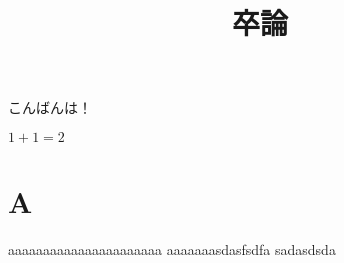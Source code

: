 \documentclass{jsarticle}
\title{卒論}
\theoremstyle{definition}
\begin{document}
\maketitle
こんばんは！

$1 + 1 = 2$


\section{A}

aaaaaaaaaaaaaaaaaaaaaa
aaaaaaasdasfsdfa sadasdsda
\end{document}
